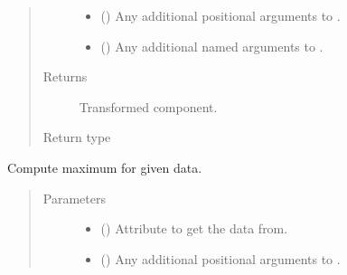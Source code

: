 \documentclass[letterpaper,10pt,english]{sphinxmanual}
\begin{document}
\begin{fulllineitems}
\begin{fulllineitems}
\begin{quote}
\begin{description}
\begin{itemize}
\item {} 
 () \textendash{} Any additional positional arguments to .

\item {} 
 () \textendash{} Any additional named arguments to .

\end{itemize}

\item[{Returns}] \leavevmode
{} \textendash{} Transformed component.

\item[{Return type}] \leavevmode
{\hyperref[\detokenize{api/base_classes:geology.src.base_spatial.SpatialComponent}]{}}

\end{description}\end{quote}

\end{fulllineitems}


\begin{fulllineitems}
\label{\detokenize{api/rock:geology.src.Rock.maximum}}
Compute maximum for given data.
\begin{quote}\begin{description}
\item[{Parameters}] \leavevmode\begin{itemize}
\item {} 
 (\sphinxstyleliteralemphasis{\sphinxupquote{, }}) \textendash{} Attribute to get the data from.

\item {} 
 () \textendash{} Any additional positional arguments to .


\end{itemize}
\end{description}
\end{quote}
\end{fulllineitems}
\end{fulllineitems}
\end{document}

